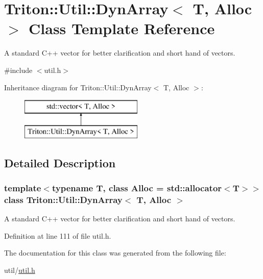 \hypertarget{class_triton_1_1_util_1_1_dyn_array}{}\section{Triton\+:\+:Util\+:\+:Dyn\+Array$<$ T, Alloc $>$ Class Template Reference}
\label{class_triton_1_1_util_1_1_dyn_array}


A standard C++ vector for better clarification and short hand of vectors.  




{\ttfamily \#include $<$util.\+h$>$}

Inheritance diagram for Triton\+:\+:Util\+:\+:Dyn\+Array$<$ T, Alloc $>$\+:\begin{figure}[H]
\begin{center}
\leavevmode
\includegraphics[height=2.000000cm]{class_triton_1_1_util_1_1_dyn_array}
\end{center}
\end{figure}


\subsection{Detailed Description}
\subsubsection*{template$<$typename T, class Alloc = std\+::allocator$<$\+T$>$$>$class Triton\+::\+Util\+::\+Dyn\+Array$<$ T, Alloc $>$}

A standard C++ vector for better clarification and short hand of vectors. 

Definition at line 111 of file util.\+h.



The documentation for this class was generated from the following file\+:\begin{DoxyCompactItemize}
\item 
util/\hyperlink{util_2util_8h}{util.\+h}\end{DoxyCompactItemize}
